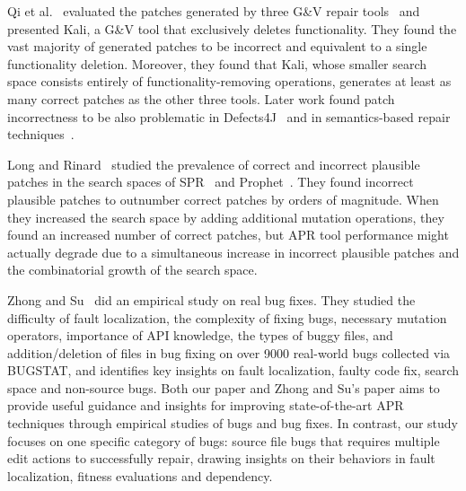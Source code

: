 \documentclass[sigconf, timestamp-false, anonymous=true]{acmart}
\begin{document}
Qi et al.~\cite{patch-correctness} evaluated the patches generated 
by three G\&V repair tools~\cite{genprog, ae, rsrepair} and presented 
Kali, a G\&V tool that exclusively deletes functionality. They found the 
vast majority of generated patches to be incorrect and equivalent to 
a single functionality deletion. Moreover, they found that Kali, whose 
smaller search space consists entirely of functionality-removing 
operations, generates at least as many correct patches as the 
other three tools. Later work found patch incorrectness to be 
also problematic in Defects4J~\cite{d4j-eval} and in semantics-based 
repair techniques~\cite{Le2018}.

Long and Rinard~\cite{long-search-spaces} studied the prevalence of 
correct and incorrect plausible patches in the search spaces of SPR~\cite{spr} 
and Prophet~\cite{prophet}. They found incorrect plausible patches to outnumber 
correct patches by orders of magnitude. When they increased the search space 
by adding additional mutation operations, they found an increased number of 
correct patches, but APR tool performance might actually degrade due to a 
simultaneous increase in incorrect plausible patches and the combinatorial 
growth of the search space.

Zhong and Su~\cite{zhong2015} did an empirical study on real bug fixes. 
They studied the difficulty of fault localization, the complexity of fixing bugs, 
necessary mutation operators, importance of API knowledge, the types of buggy files, 
and addition/deletion of files in bug fixing on over 9000 real-world bugs collected via BUGSTAT, 
and identifies key insights on fault localization, faulty code fix, search space and non-source bugs. 
Both our paper and Zhong and Su's paper aims to provide useful guidance and insights for 
improving state-of-the-art APR techniques through empirical studies of bugs and bug fixes. 
In contrast, our study focuses on one specific category of bugs: 
source file bugs that requires multiple edit actions to successfully repair, 
drawing insights on their behaviors in fault localization, fitness evaluations and dependency.
\end{document}
